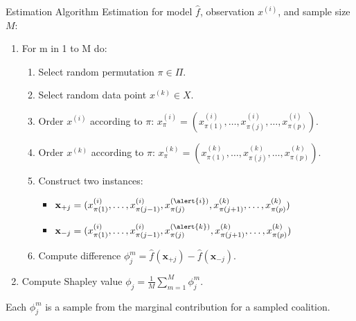 \documentclass[aspectratio=169]{../latex_main/tntbeamer}  %
\begin{document}
\begin{frame}{Estimation Algorithm }
Estimation for model $\hat{f}$, observation $x^{(i)}$, and sample size $M$:
  \begin{enumerate}
      \item For m in 1 to M do:
      \begin{enumerate}
        \item Select random permutation $\pi \in \Pi$.
        \item Select random data point $x^{(k)} \in X$.
        \pause
        \item Order $x^{(i)}$ according to $\pi$: $x^{(i)}_{\pi} = (x^{(i)}_{\pi(1)}, \ldots, x^{(i)}_{\pi(j)}, \ldots, x^{(i)}_{\pi(p)})$.
        \item Order $x^{(k)}$ according to $\pi$: $x^{(k)}_{\pi} = (x^{(k)}_{\pi(1)}, \ldots, x^{(k)}_{\pi(j)}, \ldots, x^{(k)}_{\pi(p)})$.
        \pause
        \item Construct two instances:
          \begin{itemize}
            \item $\mathbf{x}_{+j} = (x^{(i)}_{\pi(1)}, \ldots, x^{(i)}_{\pi(j - 1)}, x^{(\alert{i})}_{\pi(j)}, x^{(k)}_{\pi(j + 1)}, \ldots, x^{(k)}_{\pi(p)}) $
            \item $\mathbf{x}_{-j} = (x^{(i)}_{\pi(1)}, \ldots, x^{(i)}_{\pi(j - 1)}, x^{(\alert{k})}_{\pi(j)}, x^{(k)}_{\pi(j + 1)}, \ldots, x^{(k)}_{\pi(p)}) $
          \end{itemize}
          \pause
        \item Compute difference $\phi_j^m = \hat{f}(\mathbf{x}_{+j}) - \hat{f}(\mathbf{x}_{-j})$.
      \end{enumerate}
    \item Compute Shapley value $\phi_j = \frac{1}{M}\sum_{m=1}^M \phi_j^m$.
  \end{enumerate}

  Each $\phi_j^m$ is a sample from the marginal contribution for a sampled coalition.

\end{frame}
\end{document}
